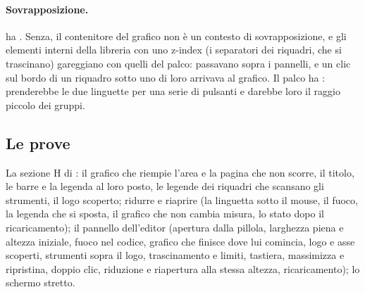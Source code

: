 \paragraph{Sovrapposizione.}  ha . Senza, il
contenitore del grafico non è un contesto di sovrapposizione, e gli elementi
interni della libreria con uno z-index (i separatori dei riquadri, che si
trascinano) gareggiano con quelli del palco: passavano sopra i pannelli, e un
clic sul bordo di un riquadro sotto uno di loro arrivava al grafico. Il palco ha :  prenderebbe
le due linguette per una serie di pulsanti e darebbe loro il raggio piccolo
dei gruppi.

\subsection{Le prove}

La sezione H di : il grafico che riempie l'area e
la pagina che non scorre, il titolo, le barre e la legenda al loro posto, le
legende dei riquadri che scansano gli strumenti, il logo scoperto; ridurre e
riaprire (la linguetta sotto il mouse, il fuoco, la legenda che si sposta, il
grafico che non cambia misura, lo stato dopo il ricaricamento); il pannello
dell'editor (apertura dalla pillola, larghezza piena e altezza iniziale,
fuoco nel codice, grafico che finisce dove lui comincia, logo e asse scoperti,
strumenti sopra il logo, trascinamento e limiti, tastiera, massimizza e
ripristina, doppio clic, riduzione e riapertura alla stessa altezza,
ricaricamento); lo schermo stretto.
